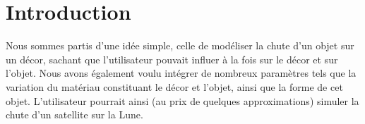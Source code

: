 \section{Introduction}
Nous sommes partis d'une idée simple, celle de modéliser la chute d'un objet sur un
décor, sachant que l'utilisateur pouvait influer à la fois sur le décor et sur l'objet.
Nous avons également voulu intégrer de nombreux paramètres tels que la 
variation du matériau constituant le décor et l'objet, ainsi que la forme de cet objet.
L'utilisateur pourrait ainsi (au prix de quelques approximations)
simuler la chute d'un satellite sur la Lune.
